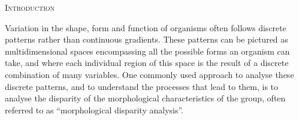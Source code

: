 \documentclass[12pt,letterpaper]{article}
\renewcommand{\section}[1]{%
\bigskip
\begin{center}
\begin{Large}
\normalfont\scshape #1
\medskip
\end{Large}
\end{center}}
\begin{document}




    







%
%

\section{Introduction}

Variation in the shape, form and function of organisms often follows discrete patterns rather than continuous gradients.
These patterns can be pictured as multidimensional spaces encompassing all the possible forms an organism can take, and where each individual region of this space is the result of a discrete combination of many variables.
One commonly used approach to analyse these discrete patterns, and to understand the processes that lead to them, is to analyse the disparity of the morphological characteristics of the group, often referred to as ``morphological disparity analysis''.
\end{document}
